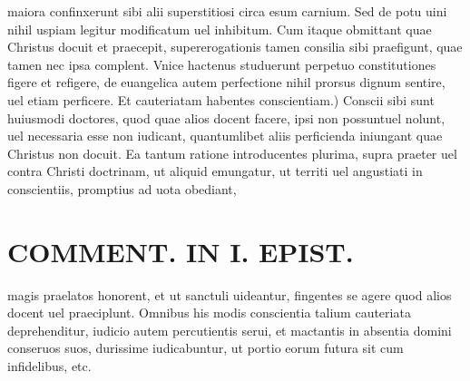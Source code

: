 \documentclass{article}
\begin{document}
\begin{pages}
maiora confinxerunt sibi alii superstitiosi circa esum carnium. Sed de potu uini nihil uspiam legitur modificatum uel inhibitum. Cum itaque obmittant quae Christus docuit et praecepit, supererogationis tamen consilia sibi praefigunt, quae tamen nec ipsa complent. Vnice hactenus studuerunt perpetuo constitutiones figere et refigere, de euangelica autem perfectione nihil prorsus dignum sentire, uel etiam perficere. Et cauteriatam habentes conscientiam.) Conscii sibi sunt huiusmodi doctores, quod quae alios docent facere, ipsi non possuntuel nolunt, uel necessaria esse non iudicant, quantumlibet aliis perficienda iniungant quae Christus non docuit. Ea tantum ratione introducentes plurima, supra praeter uel contra Christi doctrinam, ut aliquid emungatur, ut territi uel angustiati in conscientiis, promptius ad uota obediant,  \pend
\section*{COMMENT. IN I. EPIST. }
\marginpar{[ p.506 ]}\pstart magis praelatos honorent, et ut sanctuli uideantur, fingentes se agere quod alios docent uel praeciplunt. Omnibus his modis conscientia talium cauteriata deprehenditur, iudicio autem percutientis serui, et mactantis in absentia domini conseruos suos, durissime iudicabuntur, ut portio eorum futura sit cum infidelibus, etc.  \pend
{}
{}

\end{pages}
\end{document}
